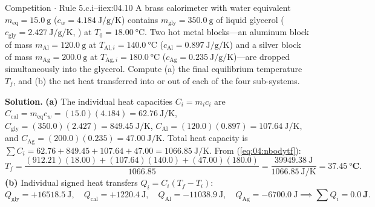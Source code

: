 \begin{workedexample}{Competition $\cdot$ Rule 5.c.i--ii}{ex:04.10}
A brass calorimeter with water equivalent $m_{\mathrm{eq}} = \SI{15.0}{\gram}$ ($c_w = \SI{4.184}{\joule\per\gram\per\kelvin}$) contains $m_{\mathrm{gly}} = \SI{350.0}{\gram}$ of liquid glycerol ($c_{\mathrm{gly}} = \SI{2.427}{\joule\per\gram\per\kelvin}$, ) at $T_0 = \SI{18.00}{\celsius}$. Two hot metal blocks---an aluminum block of mass $m_{\mathrm{Al}} = \SI{120.0}{\gram}$ at $T_{\mathrm{Al},i} = \SI{140.0}{\celsius}$ ($c_{\mathrm{Al}} = \SI{0.897}{\joule\per\gram\per\kelvin}$) and a silver block of mass $m_{\mathrm{Ag}} = \SI{200.0}{\gram}$ at $T_{\mathrm{Ag},i} = \SI{180.0}{\celsius}$ ($c_{\mathrm{Ag}} = \SI{0.235}{\joule\per\gram\per\kelvin}$)---are dropped simultaneously into the glycerol. Compute (a) the final equilibrium temperature $T_f$, and (b) the net heat transferred into or out of each of the four sub-systems.

\textbf{Solution.}
\textbf{(a)} The individual heat capacities $C_i = m_i c_i$ are $C_{\mathrm{cal}} = m_{\mathrm{eq}} c_w = (15.0)(4.184) = \SI{62.76}{\joule\per\kelvin}$, $C_{\mathrm{gly}} = (350.0)(2.427) = \SI{849.45}{\joule\per\kelvin}$, $C_{\mathrm{Al}} = (120.0)(0.897) = \SI{107.64}{\joule\per\kelvin}$, and $C_{\mathrm{Ag}} = (200.0)(0.235) = \SI{47.00}{\joule\per\kelvin}$.
Total heat capacity is $\sum C_i = 62.76 + 849.45 + 107.64 + 47.00 = \SI{1066.85}{\joule\per\kelvin}$. From (\ref{eq:04:nbodytf}):
\[
  T_f = \frac{(912.21)(18.00) + (107.64)(140.0) + (47.00)(180.0)}{1066.85} = \frac{\SI{39949.38}{\joule}}{\SI{1066.85}{\joule\per\kelvin}} = \mathbf{\SI{37.45}{\celsius}}.
\]
\textbf{(b)} Individual signed heat transfers $Q_i = C_i(T_f - T_i)$:
\[
  Q_{\mathrm{gly}} = +\SI{16518.5}{\joule}, \quad
  Q_{\mathrm{cal}} = +\SI{1220.4}{\joule}, \quad
  Q_{\mathrm{Al}} = -\SI{11038.9}{\joule}, \quad
  Q_{\mathrm{Ag}} = -\SI{6700.0}{\joule} \implies \sum Q_i = \mathbf{\SI{0.0}{\joule}}.
\]
\end{workedexample}

